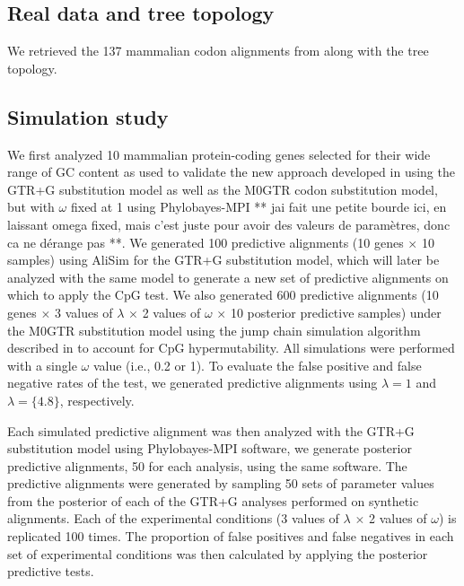 \documentclass{article}
\begin{document}
\subsection*{Real data and tree topology}
We retrieved the 137 mammalian codon alignments from \citet{LaurinLemay2018a} along with the tree topology.

\subsection*{Simulation study}
We first analyzed 10 mammalian protein-coding genes selected for their wide range of GC content as used to validate the new approach developed in \citet{LaurinLemay2018b} using the GTR+G substitution model as well as the M0GTR codon substitution model, but with $\omega$ fixed at 1 \citep{Yang2000} using Phylobayes-MPI \citep{Lartillot2013} ** jai fait une petite bourde ici, en laissant omega fixed, mais c'est juste pour avoir des valeurs de paramètres, donc ca ne dérange pas **.  We generated 100 predictive alignments (10 genes $\times$ 10 samples) using AliSim \citep{LyTrong2022} for the GTR+G substitution model, which will later be analyzed with the same model to generate a new set of predictive alignments on which to apply the CpG test.  We also generated 600 predictive alignments (10 genes $\times$ 3 values of $\lambda$ $\times$ 2 values of $\omega$ $\times$ 10 posterior predictive samples) under the M0GTR substitution model using the jump chain simulation algorithm described in \citet{LaurinLemay2022} to account for CpG hypermutability. All simulations were performed with a single $\omega$ value (i.e., 0.2 or 1). To evaluate the false positive and false negative rates of the test, we generated predictive alignments using $\lambda = 1$ and $\lambda = \{4.8\}$, respectively.

Each simulated predictive alignment was then analyzed with the GTR+G substitution model using Phylobayes-MPI \citep{Lartillot2013} software, we generate posterior predictive alignments, 50 for each analysis, using the same software.  The predictive alignments were generated by sampling 50 sets of parameter values from the posterior of each of the GTR+G analyses performed on synthetic alignments. Each of the experimental conditions (3 values of $\lambda$ $\times$ 2 values of $\omega$) is replicated 100 times.  The proportion of false positives and false negatives in each set of experimental conditions was then calculated by applying the posterior predictive tests.
\end{document}
